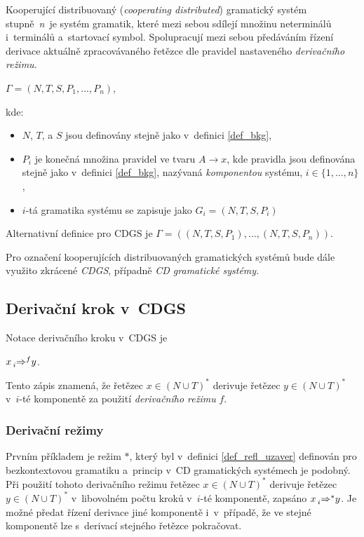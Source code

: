 Kooperující distribuovaný (\emph{cooperating distributed}) gramatický systém stupně~\emph{n}~je systém gramatik, které mezi sebou sdílejí množinu neterminálů i~terminálů a~startovací symbol.
Spolupracují mezi sebou předáváním řízení derivace aktuálně zpracovávaného řetězce dle pravidel nastaveného \emph{derivačního režimu}.

\begin{definition}\label{def_cdgs}
\begin{center}
    $\Gamma = (N, T, S, P_1, \ldots ,P_n)$,
\end{center}
kde:
\begin{itemize}
    \item $N$, $T$, a $S$ jsou definovány stejně jako v~definici \ref{def_bkg},
    \item $P_i$ je konečná množina pravidel ve tvaru $A\rightarrow x$, kde pravidla jsou definována stejně jako v~definici \ref{def_bkg}, nazývaná \emph{komponentou} systému, $i \in \{1, \ldots, n\}$,
    \item $i$-tá gramatika systému se zapisuje jako $G_i = (N,T,S,P_i)$
\end{itemize}   
Alternativní definice pro CDGS je $\Gamma = ((N, T, S, P_1), \ldots , (N, T, S, P_n))$.
\end{definition}

\begin{convention}
    Pro označení kooperujících distribuovaných gramatických systémů bude dále využito zkrácené \emph{CDGS}, případně \emph{CD gramatické systémy}.
\end{convention}

\subsection*{Derivační krok v~CDGS}
Notace derivačního kroku v~CDGS je
\begin{center}
    $x \prescript{}{i}{\Rightarrow}^{f} y$.
\end{center}
Tento zápis znamená, že řetězec $x \in (N \cup T)^{*}$ derivuje řetězec $y \in (N \cup T)^{*}$ v~$i$-té komponentě za použití \emph{derivačního režimu} $f$.

\subsubsection*{Derivační režimy}

Prvním příkladem je režim $*$, který byl v~definici \ref{def_refl_uzaver} definován pro bezkontextovou gramatiku a~princip v~CD gramatických systémech je podobný.
Při použití tohoto derivačního režimu řetězec $x \in (N \cup T)^*$ derivuje řetězec $y \in (N \cup T)^*$ v~libovolném počtu kroků v~$i$-té komponentě, zapsáno $x \prescript{}{i}{\Rightarrow}^{*}y$.
Je možné předat řízení derivace jiné komponentě i~v~případě, že ve stejné komponentě lze s~derivací stejného řetězce pokračovat.

